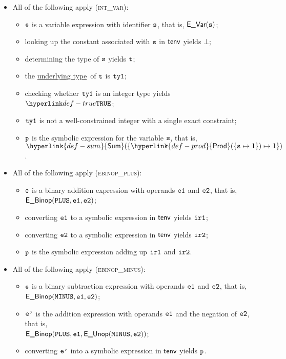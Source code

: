 \documentclass{book}
\newcommand\ProseOrTypeError[0]{\ProseTerminateAs{\TypeErrorConfig}}
\newcommand\Prod[0]{\hyperlink{def-prod}{\textsf{Prod}}}
\newcommand\Sum[0]{\hyperlink{def-sum}{\textsf{Sum}}}
\newcommand\underlyingtype[0]{\hyperlink{def-underlyingtype}{underlying type}}
\begin{document}
\begin{itemize}
  \item All of the following apply (\textsc{int\_var}):
  \begin{itemize}
    \item $\texttt{e}$ is a variable expression with identifier $\texttt{s}$, that is, $\textsf{E\_Var}(\texttt{s})$;
    \item looking up the constant associated with $\texttt{s}$ in $\textsf{tenv}$ yields $\bot$;
    \item determining the type of $\texttt{s}$ yields $\texttt{t}$\ProseOrTypeError;
    \item the \underlyingtype\ of $\texttt{t}$ is $\texttt{ty1}$\ProseOrTypeError;
    \item checking whether $\texttt{ty1}$ is an integer type yields $\True$\ProseOrTypeError;
    \item $\texttt{ty1}$ is not a well-constrained integer with a single exact constraint;
    \item $\texttt{p}$ is the symbolic expression for the variable $\texttt{s}$, that is, $\Sum( \{ \Prod(\{\vs\mapsto 1\})\mapsto 1 \} )$.
  \end{itemize}

  \item All of the following apply (\textsc{ebinop\_plus}):
  \begin{itemize}
    \item $\texttt{e}$ is a binary addition expression with operands $\texttt{e1}$ and $\texttt{e2}$, that is, \\ $\textsf{E\_Binop}(\texttt{PLUS}, \texttt{e1}, \texttt{e2})$;
    \item converting $\texttt{e1}$ to a symbolic expression in $\textsf{tenv}$ yields $\texttt{ir1}$\ProseOrTypeErrorOrBot;
    \item converting $\texttt{e2}$ to a symbolic expression in $\textsf{tenv}$ yields $\texttt{ir2}$\ProseOrTypeErrorOrBot;
    \item $\texttt{p}$ is the symbolic expression adding up $\texttt{ir1}$ and $\texttt{ir2}$.
  \end{itemize}

  \item All of the following apply (\textsc{ebinop\_minus}):
  \begin{itemize}
    \item $\texttt{e}$ is a binary subtraction expression with operands $\texttt{e1}$ and $\texttt{e2}$, that is, \\ $\textsf{E\_Binop}(\texttt{MINUS}, \texttt{e1}, \texttt{e2})$;
    \item $\texttt{e'}$ is the addition expression with operands $\texttt{e1}$ and the negation of $\texttt{e2}$, that is, \\ $\textsf{E\_Binop}(\texttt{PLUS}, \texttt{e1}, \textsf{E\_Unop}(\texttt{MINUS}, \texttt{e2}))$;
    \item converting $\texttt{e'}$ into a symbolic expression in $\textsf{tenv}$ yields $\texttt{p}$\ProseOrTypeErrorOrBot.
  \end{itemize}


\end{itemize}
\end{document}
